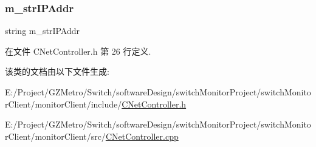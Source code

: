 \subsubsection{\texorpdfstring{m\+\_\+str\+I\+P\+Addr}{m\_strIPAddr}}
{\footnotesize\ttfamily string m\+\_\+str\+I\+P\+Addr\hspace{0.3cm}{\ttfamily [private]}}



在文件 C\+Net\+Controller.\+h 第 26 行定义.



该类的文档由以下文件生成\+:\begin{DoxyCompactItemize}
\item 
E\+:/\+Project/\+G\+Z\+Metro/\+Switch/software\+Design/switch\+Monitor\+Project/switch\+Monitor\+Client/monitor\+Client/include/\hyperlink{_c_net_controller_8h}{C\+Net\+Controller.\+h}\item 
E\+:/\+Project/\+G\+Z\+Metro/\+Switch/software\+Design/switch\+Monitor\+Project/switch\+Monitor\+Client/monitor\+Client/src/\hyperlink{_c_net_controller_8cpp}{C\+Net\+Controller.\+cpp}\end{DoxyCompactItemize}
